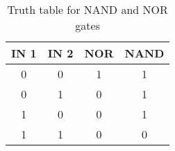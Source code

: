 \documentclass[a4paper]{report}
\author{hephaisto}
\title{\moduleTitle}
\begin{document}

\begin{table}
	\centering
	\begin{tabular}{|cc|cc|}\hline
		IN 1 & IN 2 & NOR & NAND \\\hline\hline
		0 & 0 & 1 & 1 \\\hline
		0 & 1 & 0 & 1 \\\hline
		1 & 0 & 0 & 1 \\\hline
		1 & 1 & 0 & 0 \\\hline
	\end{tabular}
	\caption{Truth table for NAND and NOR gates}
	\label{tab:b_truthtable}
\end{table}



\end{document}
